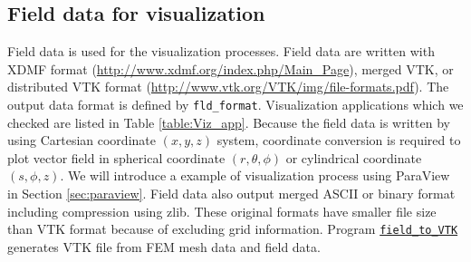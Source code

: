 \subsection{Field data for visualization}
\label{sec:VTK}
Field data is used for the visualization processes. Field data are written with XDMF format (\url{http://www.xdmf.org/index.php/Main_Page}), merged VTK, or distributed VTK format (\url{http://www.vtk.org/VTK/img/file-formats.pdf}). The output data format is defined by \verb|fld_format|. Visualization applications which we checked are listed in Table \ref{table:Viz_app}. Because the field data is written by using Cartesian coordinate $(x,y,z)$ system, coordinate conversion is required to plot vector field in spherical coordinate $(r, \theta, \phi)$ or cylindrical coordinate $(s,\phi, z)$. We will introduce a example of visualization process using ParaView in Section \ref{sec:paraview}. Field data also output merged ASCII or binary format including compression using zlib. These original formats have smaller file size than VTK format because of excluding grid information. Program \hyperref[sec:field_to_VTK]{\tt field\_to\_VTK} generates VTK file from FEM mesh data and field data.
%
